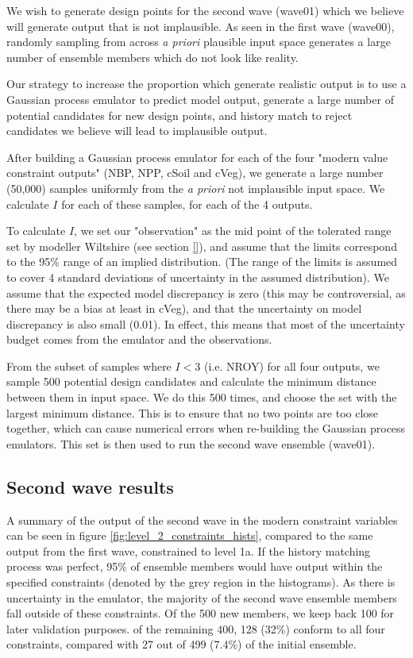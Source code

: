 \documentclass[gmd, manuscript]{copernicus}
\begin{document}
We wish to generate design points for the second wave (wave01) which we believe will generate output that is not implausible. As seen in the first wave (wave00), randomly sampling from across \emph{a priori} plausible input space generates a large number of ensemble members which do not look like reality.

Our strategy to increase the proportion which generate realistic output is to use a Gaussian process emulator to predict model output, generate a large number of potential candidates for new design points, and history match to reject candidates we believe will lead to implausible output.

After building a Gaussian process emulator for each of the four "modern value constraint outputs" (NBP, NPP, cSoil and cVeg), we generate a large number (50,000) samples uniformly from the \emph{a priori} not implausible input space. We calculate $I$ for each of these samples, for each of the 4 outputs. 

To calculate $I$, we set our "observation" as the mid point of the tolerated range set by modeller Wiltshire (see section \ref{}), and assume that the limits correspond to the 95\% range of an implied distribution. (The range of the limits is assumed to cover 4 standard deviations of uncertainty in the assumed distribution). We assume that the expected model discrepancy is zero (this may be controversial, as there may be a bias at least in cVeg), and that the uncertainty on model discrepancy is also small (0.01). In effect, this means that most of the uncertainty budget comes from the emulator and the observations.

From the subset of samples where $I < 3$ (i.e. NROY) for all four outputs, we sample 500 potential design candidates and calculate the minimum distance between them in input space. We do this 500 times, and choose the set with the largest minimum distance. This is to ensure that no two points are too close together, which can cause numerical errors when re-building the Gaussian process emulators. This set is then used to run the second wave ensemble (wave01).

\subsection{Second wave results}\label{ssec:second_wave_results}

A summary of the output of the second wave in the modern constraint variables can be seen in figure \ref{fig:level_2_constraints_hists}, compared to the same output from the first wave, constrained to level 1a. If the history matching process was perfect, 95\% of ensemble members would have output within the specified constraints (denoted by the grey region in the histograms). As there is uncertainty in the emulator, the majority of the second wave ensemble members fall outside of these constraints. Of the 500 new members, we keep back 100 for later validation purposes. of the remaining 400, 128 (32\%) conform to all four constraints, compared with 27 out of 499 (7.4\%) of the initial ensemble.
\end{document}

